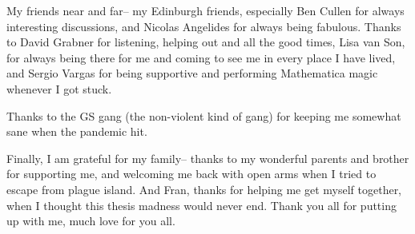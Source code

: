 My friends near and far-- my Edinburgh friends, especially Ben Cullen for always interesting discussions, and Nicolas Angelides for always being fabulous. Thanks to David Grabner for listening, helping out and all the good times, Lisa van Son, for always being there for me and coming to see me in every place I have lived, and Sergio Vargas for being supportive and performing Mathematica magic whenever I got stuck.

Thanks to the GS gang (the non-violent kind of gang) for keeping me somewhat sane when the pandemic hit. 

Finally, I am grateful for my family-- thanks to my wonderful parents and brother for supporting me, and welcoming me back with open arms when I tried to escape from plague island. And Fran, thanks for helping me get myself together, when I thought this thesis madness would never end. Thank you all for putting up with me, much love for you all. 



